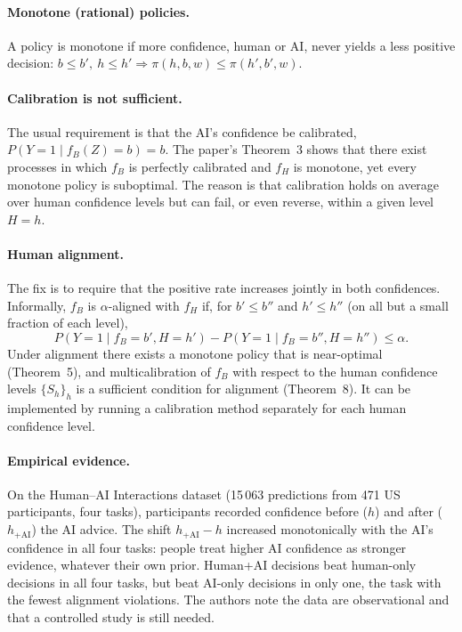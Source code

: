 \documentclass[11pt,a4paper]{article}
\renewcommand{\_}{\textunderscore\allowbreak}
\begin{document}
\paragraph{Monotone (rational) policies.} A policy is monotone if more confidence, human or AI, never yields a
less positive decision: $b\le b',\ h\le h' \Rightarrow \pi(h,b,w)\le\pi(h',b',w)$.

\paragraph{Calibration is not sufficient.} The usual requirement is that the AI's confidence be calibrated,
$P(Y=1\mid f_B(Z)=b)=b$. The paper's Theorem~3 shows that there exist processes in which $f_B$ is perfectly
calibrated and $f_H$ is monotone, yet every monotone policy is suboptimal. The reason is that calibration holds
on average over human confidence levels but can fail, or even reverse, within a given level $H=h$.

\paragraph{Human alignment.} The fix is to require that the positive rate increases jointly in both
confidences. Informally, $f_B$ is $\alpha$-aligned with $f_H$ if, for $b'\le b''$ and $h'\le h''$ (on all but a
small fraction of each level),
\begin{equation}
P(Y=1\mid f_B=b',H=h')-P(Y=1\mid f_B=b'',H=h'')\le\alpha .
\end{equation}
Under alignment there exists a monotone policy that is near-optimal (Theorem~5), and multicalibration of $f_B$
with respect to the human confidence levels $\{S_h\}_h$ is a sufficient condition for alignment (Theorem~8). It
can be implemented by running a calibration method separately for each human confidence level.

\paragraph{Empirical evidence.} On the Human--AI Interactions dataset (15\,063 predictions from 471 US
participants, four tasks), participants recorded confidence before ($h$) and after ($h_{+\mathrm{AI}}$) the AI
advice. The shift $h_{+\mathrm{AI}}-h$ increased monotonically with the AI's confidence in all four tasks:
people treat higher AI confidence as stronger evidence, whatever their own prior. Human+AI decisions beat
human-only decisions in all four tasks, but beat AI-only decisions in only one, the task with the fewest
alignment violations. The authors note the data are observational and that a controlled study is still needed.
\end{document}
